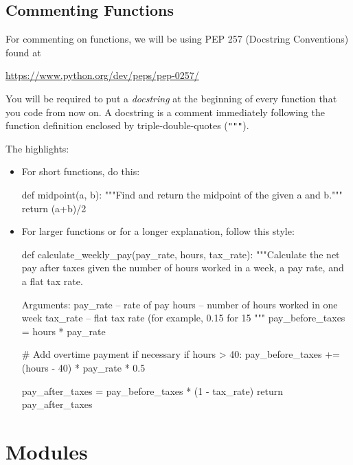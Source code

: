 \documentclass[11pt]{cselabheader}
\begin{document}
\pagebreak
\subsection{Commenting Functions}

For commenting on functions, we will be using PEP 257 (Docstring Conventions)
found at
\begin{center}
  \url{https://www.python.org/dev/peps/pep-0257/}
\end{center}

You will be required to put a \emph{docstring} at the beginning of every
function that you code from now on. A docstring is a comment immediately
following the function definition enclosed by triple-double-quotes (\texttt{"""}).

The highlights:
\begin{itemize}
  \item For short functions, do this:

    \begin{python3code}
def midpoint(a, b):
    """Find and return the midpoint of the given a and b."""
    return (a+b)/2
    \end{python3code}

  \item For larger functions or for a longer explanation, follow this style:

    \begin{python3code}
def calculate_weekly_pay(pay_rate, hours, tax_rate):
    """Calculate the net pay after taxes given the number of hours worked 
    in a week, a pay rate, and a flat tax rate.

    Arguments:
    pay_rate -- rate of pay
    hours -- number of hours worked in one week
    tax_rate -- flat tax rate (for example, 0.15 for 15%
    """
    pay_before_taxes = hours * pay_rate

    # Add overtime payment if necessary
    if hours > 40:
        pay_before_taxes += (hours - 40) * pay_rate * 0.5

    pay_after_taxes = pay_before_taxes * (1 - tax_rate)
    return pay_after_taxes
    \end{python3code}

\end{itemize}

\pagebreak
\section{Modules}
\label{sec:modules}
\end{document}
